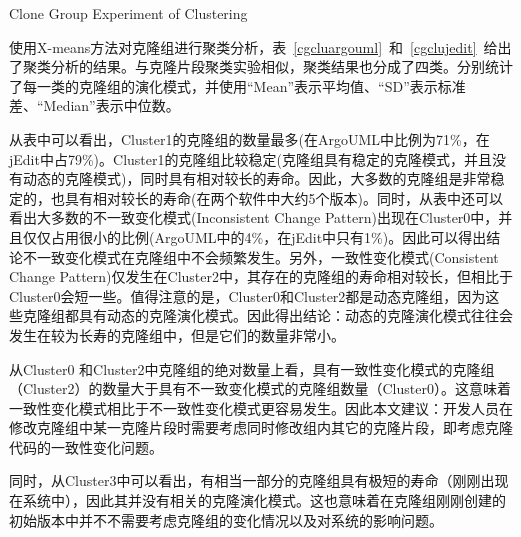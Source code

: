 {Clone Group Experiment of Clustering} 

使用X-means方法对克隆组进行聚类分析，表~\ref{cgcluargouml}~和~\ref{cgclujedit}~给出了聚类分析的结果。与克隆片段聚类实验相似，聚类结果也分成了四类。分别统计了每一类的克隆组的演化模式，并使用“Mean”表示平均值、“SD”表示标准差、“Median”表示中位数。

从表中可以看出，Cluster1的克隆组的数量最多(在ArgoUML中比例为71\%，在jEdit中占79\%)。Cluster1的克隆组比较稳定(克隆组具有稳定的克隆模式，并且没有动态的克隆模式)，同时具有相对较长的寿命。因此，大多数的克隆组是非常稳定的，也具有相对较长的寿命(在两个软件中大约5个版本)。同时，从表中还可以看出大多数的不一致变化模式(Inconsistent Change Pattern)出现在Cluster0中，并且仅仅占用很小的比例(ArgoUML中的4\%，在jEdit中只有1\%)。因此可以得出结论不一致变化模式在克隆组中不会频繁发生。另外，一致性变化模式(Consistent Change Pattern)仅发生在Cluster2中，其存在的克隆组的寿命相对较长，但相比于Cluster0会短一些。值得注意的是，Cluster0和Cluster2都是动态克隆组，因为这些克隆组都具有动态的克隆演化模式。因此得出结论：动态的克隆演化模式往往会发生在较为长寿的克隆组中，但是它们的数量非常小。

从Cluster0 和Cluster2中克隆组的绝对数量上看，具有一致性变化模式的克隆组（Cluster2）的数量大于具有不一致变化模式的克隆组数量（Cluster0）。这意味着一致性变化模式相比于不一致性变化模式更容易发生。因此本文建议：开发人员在修改克隆组中某一克隆片段时需要考虑同时修改组内其它的克隆片段，即考虑克隆代码的一致性变化问题。

同时，从Cluster3中可以看出，有相当一部分的克隆组具有极短的寿命（刚刚出现在系统中），因此其并没有相关的克隆演化模式。这也意味着在克隆组刚刚创建的初始版本中并不不需要考虑克隆组的变化情况以及对系统的影响问题。


